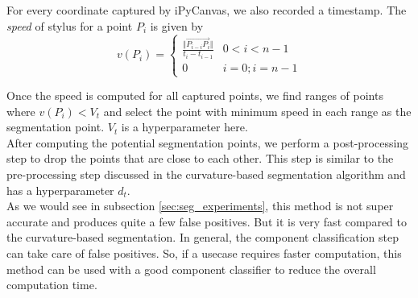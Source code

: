 For every coordinate captured by iPyCanvas, we also recorded a timestamp. The \textit{speed} of stylus for a point $P_i$ is given by
\begin{equation}
	v(P_i) = \begin{cases}
		\frac{\Vert \overrightarrow{P_{i-i} P_i}  \Vert}{t_i - t_{i - 1}} & 0 < i < n - 1\\
		0 & i = 0; i = n-1
	\end{cases}
\end{equation}

Once the speed is computed for all captured points, we find ranges of points where $v(P_i) < V_t$ and select the point with minimum speed in each range as the segmentation point. $V_t$ is a hyperparameter here.\\

After computing the potential segmentation points, we perform a post-processing step to drop the points that are close to each other. This step is similar to the pre-processing step discussed in the curvature-based segmentation algorithm and has a hyperparameter $d_t$.\\

As we would see in subsection \ref{sec:seg_experiments}, this method is not super accurate and produces quite a few false positives. But it is very fast compared to the curvature-based segmentation. In general, the component classification step can take care of false positives. So, if a usecase requires faster computation, this method can be used with a good component classifier to reduce the overall computation time.


